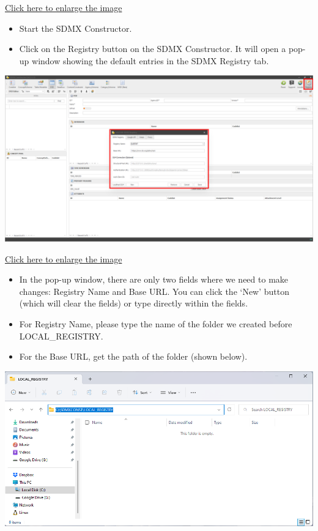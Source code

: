 \documentclass[
]{book}
\providecommand{\tightlist}{%
  \setlength{\itemsep}{0pt}\setlength{\parskip}{0pt}}
\theoremstyle{definition}
\theoremstyle{definition}
\theoremstyle{definition}
\theoremstyle{definition}
\theoremstyle{remark}
\begin{document}
\href{images/image048.png}{Click here to enlarge the image}

\begin{itemize}
\tightlist
\item
  Start the SDMX Constructor.
\item
  Click on the Registry button on the SDMX Constructor. It will open a pop-up window showing the default entries in the SDMX Registry tab.
\end{itemize}

\begin{center}\includegraphics[width=1\linewidth]{./images/image050} \end{center}

\href{images/image050.png}{Click here to enlarge the image}

\begin{itemize}
\tightlist
\item
  In the pop-up window, there are only two fields where we need to make changes: Registry Name and Base URL. You can click the `New' button (which will clear the fields) or type directly within the fields.
\item
  For Registry Name, please type the name of the folder we created before LOCAL\_REGISTRY.
\item
  For the Base URL, get the path of the folder (shown below).
\end{itemize}

\begin{center}\includegraphics[width=1\linewidth]{./images/image052} \end{center}
\end{document}
